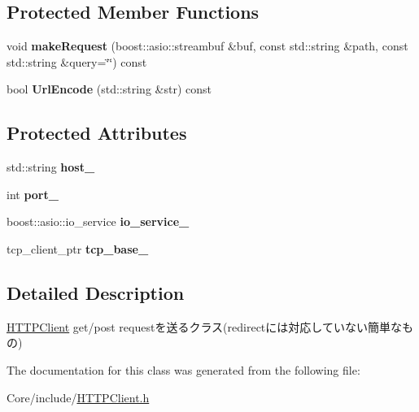\subsection*{Protected Member Functions}
\begin{DoxyCompactItemize}
\item 
\hypertarget{classskl_1_1_h_t_t_p_client_a74c9a575106b741ad6cfd95f3932de18}{}\label{classskl_1_1_h_t_t_p_client_a74c9a575106b741ad6cfd95f3932de18} 
void {\bfseries make\+Request} (boost\+::asio\+::streambuf \&buf, const std\+::string \&path, const std\+::string \&query=\char`\"{}\char`\"{}) const
\item 
\hypertarget{classskl_1_1_h_t_t_p_client_a00b88c67fa4c2c817b32150541901f12}{}\label{classskl_1_1_h_t_t_p_client_a00b88c67fa4c2c817b32150541901f12} 
bool {\bfseries Url\+Encode} (std\+::string \&str) const
\end{DoxyCompactItemize}
\subsection*{Protected Attributes}
\begin{DoxyCompactItemize}
\item 
\hypertarget{classskl_1_1_h_t_t_p_client_a0e44c47f71676bcfc6ff79df3eaa60fb}{}\label{classskl_1_1_h_t_t_p_client_a0e44c47f71676bcfc6ff79df3eaa60fb} 
std\+::string {\bfseries host\+\_\+}
\item 
\hypertarget{classskl_1_1_h_t_t_p_client_a8676f73a1afa20928a4c5b9b4a781ddf}{}\label{classskl_1_1_h_t_t_p_client_a8676f73a1afa20928a4c5b9b4a781ddf} 
int {\bfseries port\+\_\+}
\item 
\hypertarget{classskl_1_1_h_t_t_p_client_a05b976dc2f1ca592c87a7a78d5b0d909}{}\label{classskl_1_1_h_t_t_p_client_a05b976dc2f1ca592c87a7a78d5b0d909} 
boost\+::asio\+::io\+\_\+service {\bfseries io\+\_\+service\+\_\+}
\item 
\hypertarget{classskl_1_1_h_t_t_p_client_ae756b586bde61e8fb606bda4d281975c}{}\label{classskl_1_1_h_t_t_p_client_ae756b586bde61e8fb606bda4d281975c} 
tcp\+\_\+client\+\_\+ptr {\bfseries tcp\+\_\+base\+\_\+}
\end{DoxyCompactItemize}


\subsection{Detailed Description}
\hyperlink{classskl_1_1_h_t_t_p_client}{H\+T\+T\+P\+Client} get/post requestを送るクラス(redirectには対応していない簡単なもの) 

The documentation for this class was generated from the following file\+:\begin{DoxyCompactItemize}
\item 
Core/include/\hyperlink{_h_t_t_p_client_8h}{H\+T\+T\+P\+Client.\+h}\end{DoxyCompactItemize}
